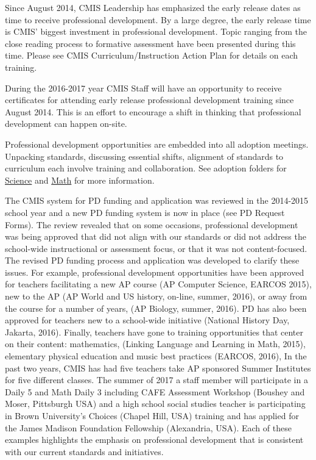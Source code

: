 \begin{findings}
Since August 2014, CMIS Leadership has emphasized the early release dates as time to receive professional development. By a large degree, the early release time is CMIS’ biggest investment in professional development. Topic ranging from the close reading process to formative assessment have been presented during this time. Please see CMIS Curriculum/Instruction Action Plan for details on each training. 

During the 2016-2017 year CMIS Staff will have an opportunity to receive certificates for attending early release professional development training since August 2014. This is an effort to encourage a shift in thinking that professional development can happen on-site. 


Professional development opportunities are embedded into all adoption meetings. Unpacking standards, discussing essential shifts, alignment of standards to curriculum each involve training and collaboration. See adoption folders for \href{https://drive.google.com/drive/folders/0ByVFfrm0zfoleXEyU3I0cTBXMVk?usp=sharing}{Science} and \href{https://drive.google.com/drive/folders/0ByVFfrm0zfolakRsUVNBaXhWcjQ?usp=sharing}{Math} for more information. 


The CMIS system for PD funding and application was reviewed in the 2014-2015 school year and a new PD funding system is now in place (see PD Request Forms). The review revealed that on some occasions, professional development was being approved that did not align with our standards or did not address the school-wide instructional or assessment focus, or that it was not content-focused. The revised PD funding process and application was developed to clarify these issues. For example, professional development opportunities have been approved for teachers facilitating a new AP course (AP Computer Science, EARCOS 2015), new to the AP (AP World and US history, on-line, summer, 2016), or away from the course for a number of years, (AP Biology, summer, 2016). PD has also been approved for teachers new to a school-wide initiative (National History Day, Jakarta, 2016). Finally, teachers have gone to training opportunities that center on their content: mathematics, (Linking Language and Learning in Math,  2015), elementary physical education and music best practices (EARCOS, 2016),  In the past two years, CMIS has had five teachers take AP sponsored Summer Institutes for five different classes. The summer of 2017 a staff member will participate in a Daily 5 and Math Daily 3 including CAFE Assessment Workshop (Boushey and Moser, Pittsburgh USA) and a high school social studies teacher is participating in Brown University’s Choices (Chapel Hill, USA) training and has applied for the James Madison Foundation Fellowship (Alexandria, USA).  Each of these examples highlights the emphasis on professional development that is consistent with our current standards and initiatives. 


\end{findings}
